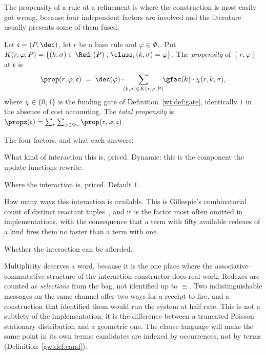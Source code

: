 The propensity of a rule at a refinement is where the construction is most easily got
wrong, because four independent factors are involved and the literature usually presents
some of them fused.

\begin{definition}[Propensity]
\label{wt:def:propensity}
Let $\mathfrak{c} = (P, \dec)$, let $r$ be a base rule and $\varphi \in \Phi_r$. Put
$K(r,\varphi,P) = \{(k,\sigma) \in \Red_r(P) : \class_r(k,\sigma) = \varphi\}$. The
\emph{propensity} of $(r,\varphi)$ at $\mathfrak{c}$ is
\[
  \prop(r,\varphi,\mathfrak{c})
  \;=\;
  \dec(\varphi) \cdot \!\!\sum_{(k,\sigma) \in K(r,\varphi,P)}\!\! \gfac(k) \cdot \chi(r,k,\sigma),
\]
where $\chi \in \{0,1\}$ is the funding gate of Definition~\ref{wt:def:gate}, identically
$1$ in the absence of cost accounting. The \emph{total propensity} is
$\propz(\mathfrak{c}) = \sum_r \sum_{\varphi \in \Phi_r} \prop(r,\varphi,\mathfrak{c})$.
\end{definition}

The four factors, and what each answers:

\begin{description}[leftmargin=1.6em,style=nextline]
  \item[$\dec(\varphi)$ --- the rate constant.] What kind of interaction this is, priced.
        Dynamic: this is the component the update functions rewrite.
  \item[$\gfac(k)$ --- the geometric factor.] Where the interaction is, priced. Default
        $1$.
  \item[The cardinality of the sum --- multiplicity.] How many ways this interaction is
        available. This is Gillespie's combinatorial count of distinct reactant
        tuples~\cite{gillespie1977exact}, and it is the factor most often omitted in
        implementations, with the consequence that a term with fifty available redexes of
        a kind fires them no faster than a term with one.
  \item[$\chi$ --- the funding gate.] Whether the interaction can be afforded.
\end{description}

Multiplicity deserves a word, because it is the one place where the associative--commutative
structure of the interaction constructor does real work. Redexes are counted as
\emph{selections} from the bag, not identified up to $\equiv$. Two indistinguishable
messages on the same channel offer two ways for a receipt to fire, and a construction that
identified them would run the system at half rate. This is not a subtlety of the
implementation; it is the difference between a truncated Poisson stationary distribution
and a geometric one. The clause language will make the same point in its own terms:
candidates are indexed by occurrences, not by terms (Definition~\ref{gw:def:cand}).

